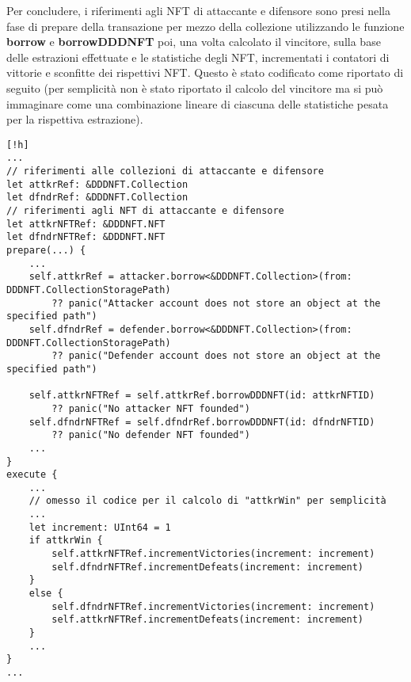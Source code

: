 Per concludere, i riferimenti agli NFT di attaccante e difensore sono presi nella fase di prepare della transazione per mezzo della collezione utilizzando le funzione \textbf{borrow} e \textbf{borrowDDDNFT} poi, una volta calcolato il vincitore, sulla base delle estrazioni effettuate e le statistiche degli NFT, incrementati i contatori di vittorie e sconfitte dei rispettivi NFT. Questo è stato codificato come riportato di seguito (per semplicità non è stato riportato il calcolo del vincitore ma si può immaginare come una combinazione lineare di ciascuna delle statistiche pesata per la rispettiva estrazione).
\begin{lstlisting}[style=all, style=cadence][!h]
...
// riferimenti alle collezioni di attaccante e difensore
let attkrRef: &DDDNFT.Collection
let dfndrRef: &DDDNFT.Collection
// riferimenti agli NFT di attaccante e difensore
let attkrNFTRef: &DDDNFT.NFT
let dfndrNFTRef: &DDDNFT.NFT
prepare(...) {
	...
    self.attkrRef = attacker.borrow<&DDDNFT.Collection>(from: DDDNFT.CollectionStoragePath) 
    	?? panic("Attacker account does not store an object at the specified path")
    self.dfndrRef = defender.borrow<&DDDNFT.Collection>(from: DDDNFT.CollectionStoragePath)
        ?? panic("Defender account does not store an object at the specified path")

    self.attkrNFTRef = self.attkrRef.borrowDDDNFT(id: attkrNFTID) 
        ?? panic("No attacker NFT founded")
    self.dfndrNFTRef = self.dfndrRef.borrowDDDNFT(id: dfndrNFTID) 
        ?? panic("No defender NFT founded")
    ...
}
execute {
	...
	// omesso il codice per il calcolo di "attkrWin" per semplicità
	...
    let increment: UInt64 = 1
    if attkrWin {
        self.attkrNFTRef.incrementVictories(increment: increment)
        self.dfndrNFTRef.incrementDefeats(increment: increment)
    }
    else {
        self.dfndrNFTRef.incrementVictories(increment: increment)
        self.attkrNFTRef.incrementDefeats(increment: increment)
    }
    ...
}
...
\end{lstlisting}